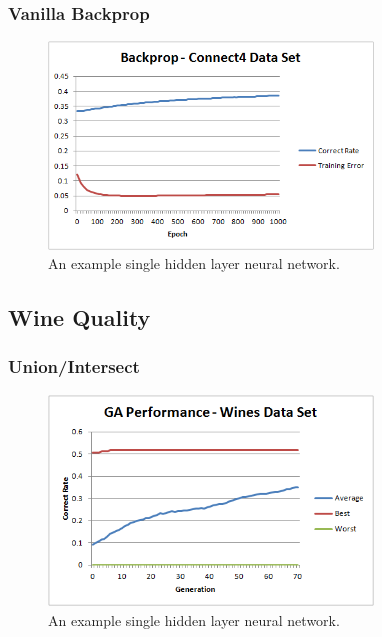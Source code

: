 \documentclass[journal]{IEEEtran}
\begin{document}
		\subsubsection{Vanilla Backprop}
			\begin{figure}[here]%
			  \centering
			  \includegraphics[width=3.4in]{brain_connect4}
			  \caption{An example single hidden layer neural network.}
			  \label{fig:brain_connect4}
			\end{figure}
			
	\subsection{Wine Quality}
		\subsubsection{Union/Intersect}
			\begin{figure}[here]%
			  \centering
			  \includegraphics[width=3.4in]{wine_performance_new}
			  \caption{An example single hidden layer neural network.}
			  \label{fig:wine_performace_new}
			\end{figure}
\end{document}

